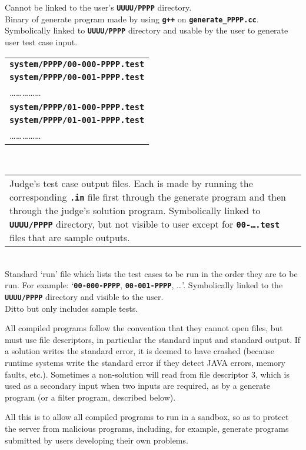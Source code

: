 \documentclass[12pt]{article}
\newcommand{\TT}[1]{{\tt \bfseries #1}}
\newcommand{\EOL}{\penalty \exhyphenpenalty}
\newenvironment{indpar}[1][0.4in]%
	{\begin{list}{}%
		     {\setlength{\itemsep}{0in}%
		      \setlength{\topsep}{0in}%
		      \setlength{\parsep}{1ex}%
		      \setlength{\labelwidth}{#1}%
		      \setlength{\leftmargin}{#1}%
		      \addtolength{\leftmargin}{\labelsep}}%
	 \item}%
	{\end{list}}
\newcommand{\ITEM}{\hspace*{-0.2in}}
\begin{document}
\begin{indpar}
    Cannot be linked to the user's \TT{UUUU/PPPP} directory.
\\
\ITEM\TT{system/PPPP/generate\_PPPP}  Binary of generate
    program made by using \TT{g++} on \TT{gen\-erate\_\EOL PPPP.cc}.
    Symbolically linked to \TT{UUUU/PPPP} directory and usable
    by the user to generate user test case input.
\\[1ex]
\ITEM\begin{tabular}[t]{@{}l}
     \TT{system/PPPP/00-000-PPPP.test} \\
     \TT{system/PPPP/00-001-PPPP.test} \\
     \ldots\ldots\ldots\ldots\ldots \\
     \TT{system/PPPP/01-000-PPPP.test} \\
     \TT{system/PPPP/01-001-PPPP.test} \\
     \ldots\ldots\ldots\ldots\ldots \\
     \end{tabular}
     ~~~~
     \begin{tabular}[t]{p{3in}}
     Judge's test case output files.  Each is made by running
     the corresponding \TT{.in} file first through the generate
     program and then through the judge's solution program.
     Symbolically linked to \TT{UUUU/PPPP}
     directory, but not visible to user except for \TT{00-\ldots.test}
     files that are sample outputs.
     \end{tabular}
\\
\ITEM\TT{system/PPPP/PPPP.run}  Standard `run' file which lists
    the test cases to be run in the order they are to be
    run.  For example:
   `{\TT{00-000-PPPP}, \TT{00-001-PPPP}, \ldots}'.
    Symbolically linked to
    the \TT{UUUU/PPPP} directory and visible to the user.
\\
\ITEM\TT{system/PPPP/sample-PPPP.run}  Ditto but only includes sample tests.
\end{indpar}

All compiled programs follow the convention that they cannot
open files, but must use file descriptors, in particular
the standard input and standard output.  If a solution writes
the standard error, it is deemed to have crashed (because
runtime systems write the standard error if they detect
JAVA errors, memory faults, etc.).  Sometimes a non-solution
will read from file descriptor 3, which is used as a secondary
input when two inputs are required, as by a generate program
(or a filter program, described below).

All this is to allow all compiled programs to run in a sandbox,
so as to protect the server from malicious programs, including,
for example, generate programs submitted by users developing
their own problems.
\end{document}
